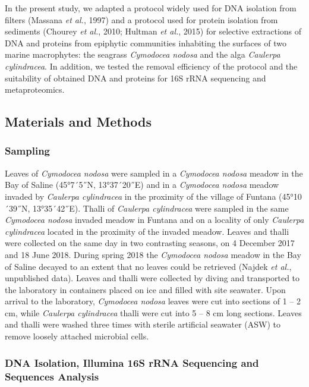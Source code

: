 \documentclass[12pt,]{article}
\begin{document}
In the present study, we adapted a protocol widely used for DNA
isolation from filters (Massana \emph{et al.}, 1997) and a protocol used
for protein isolation from sediments (Chourey \emph{et al.}, 2010;
Hultman \emph{et al.}, 2015) for selective extractions of DNA and
proteins from epiphytic communities inhabiting the surfaces of two
marine macrophytes: the seagrass \emph{Cymodocea nodosa} and the alga
\emph{Caulerpa cylindracea}. In addition, we tested the removal
efficiency of the protocol and the suitability of obtained DNA and
proteins for 16S rRNA sequencing and metaproteomics.

\newpage

\hypertarget{materials-and-methods}{%
\subsection{Materials and Methods}\label{materials-and-methods}}

\hypertarget{sampling}{%
\subsubsection{Sampling}\label{sampling}}

Leaves of \emph{Cymodocea nodosa} were sampled in a \emph{Cymodocea
nodosa} meadow in the Bay of Saline (45°7´5˝N, 13°37´20˝E) and in a
\emph{Cymodocea nodosa} meadow invaded by \emph{Caulerpa cylindracea} in
the proximity of the village of Funtana (45°10´39˝N, 13°35´42˝E). Thalli
of \emph{Caulerpa cylindracea} were sampled in the same \emph{Cymodocea
nodosa} invaded meadow in Funtana and on a locality of only
\emph{Caulerpa cylindracea} located in the proximity of the invaded
meadow. Leaves and thalli were collected on the same day in two
contrasting seasons, on 4 December 2017 and 18 June 2018. During spring
2018 the \emph{Cymodocea nodosa} meadow in the Bay of Saline decayed to
an extent that no leaves could be retrieved (Najdek \emph{et al.},
unpublished data). Leaves and thalli were collected by diving and
transported to the laboratory in containers placed on ice and filled
with site seawater. Upon arrival to the laboratory, \emph{Cymodocea
nodosa} leaves were cut into sections of 1 -- 2 \si{\cm}, while
\emph{Caulerpa cylindracea} thalli were cut into 5 -- 8 \si{\cm} long
sections. Leaves and thalli were washed three times with sterile
artificial seawater (ASW) to remove loosely attached microbial cells.

\hypertarget{dna-isolation-illumina-16s-rrna-sequencing-and-sequences-analysis}{%
\subsubsection{DNA Isolation, Illumina 16S rRNA Sequencing and Sequences
Analysis}\label{dna-isolation-illumina-16s-rrna-sequencing-and-sequences-analysis}}
\end{document}
